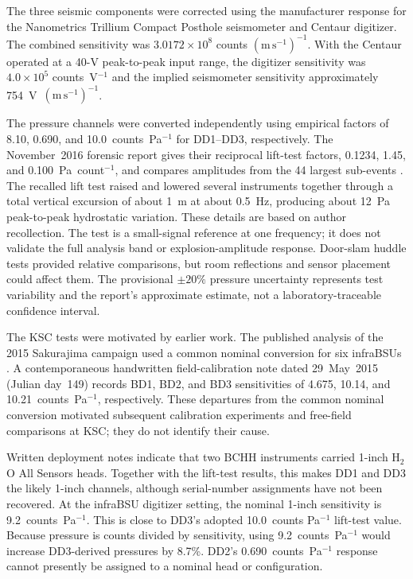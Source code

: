 \documentclass[]{seismica}
\begin{document}
The three seismic components were corrected using the manufacturer response
for the Nanometrics Trillium Compact Posthole seismometer and Centaur digitizer.
The combined sensitivity was $3.0172\times10^8$ counts
$(\mathrm{m\,s^{-1}})^{-1}$. With the Centaur operated at a 40-V peak-to-peak
input range, the digitizer sensitivity was $4.0\times10^5$ counts~V$^{-1}$ and
the implied seismometer sensitivity approximately
754~V~$(\mathrm{m\,s^{-1}})^{-1}$.

The pressure channels were converted independently using empirical factors of
8.10, 0.690, and 10.0~counts~Pa$^{-1}$ for DD1--DD3, respectively. The
November~2016 forensic report gives their reciprocal lift-test factors, 0.1234,
1.45, and 0.100~Pa~count$^{-1}$, and compares amplitudes from the 44 largest
sub-events \citep{thompson_mcnutt_fireball_2016}. The recalled lift test raised
and lowered several instruments together through a total vertical excursion of
about 1~m at about 0.5~Hz, producing about 12~Pa peak-to-peak hydrostatic
variation. These details are based on author recollection. The test is a
small-signal reference at one frequency; it does not validate the full analysis
band or explosion-amplitude response. Door-slam huddle tests provided relative
comparisons, but room reflections and sensor placement could affect them. The
provisional $\pm20\%$ pressure uncertainty represents test variability and the
report's approximate estimate, not a laboratory-traceable confidence interval.

The KSC tests were motivated by earlier work. The published analysis of the
2015 Sakurajima campaign used a common nominal conversion for six infraBSUs
\citep{smith_sakurajima_2020}. A contemporaneous handwritten field-calibration
note dated 29~May~2015 (Julian day~149) records BD1, BD2, and BD3 sensitivities
of 4.675, 10.14, and 10.21~counts~Pa$^{-1}$, respectively. These departures
from the common nominal conversion motivated subsequent calibration
experiments and free-field comparisons at KSC; they do not identify their cause.

Written deployment notes indicate that two BCHH instruments carried 1-inch
H$_2$O All Sensors heads. Together with the lift-test results, this makes DD1
and DD3 the likely 1-inch channels, although serial-number assignments have
not been recovered. At the infraBSU digitizer setting, the nominal 1-inch
sensitivity is 9.2~counts~Pa$^{-1}$. This is close to DD3's adopted 10.0~counts
Pa$^{-1}$ lift-test value. Because pressure is counts divided by sensitivity,
using 9.2~counts~Pa$^{-1}$ would increase DD3-derived pressures by 8.7\%.
DD2's 0.690~counts~Pa$^{-1}$ response cannot presently be assigned to a nominal
head or configuration.
\end{document}
